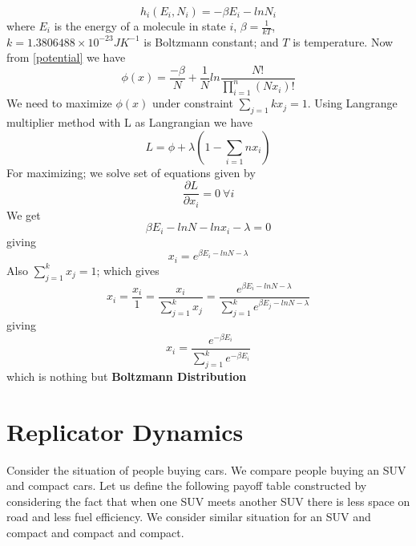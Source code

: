\documentclass[letterpaper,english,10pt]{article}
\begin{document}
\begin{equation}\label{thermogame}
    h_i(E_i,N_i) = -\beta E_i - ln N_i
\end{equation}
where $E_i$ is the energy of a molecule in state $i$, $\beta=\frac{1}{kT}$, $k=1.3806488 \times 10^{-23} JK^{-1}$ is Boltzmann constant; and $T$ is temperature.
 Now from \ref{potential} we have 
 \begin{equation}
 \phi(x) = \frac{-\beta}{N}+ \frac{1}{N}ln\frac{N!}{\prod_{i=1}^{n}(Nx_i)!}
 \end{equation}
 We need to maximize $\phi(x)$ under constraint $\sum_{j=1}{k}x_j = 1$.
 Using Langrange multiplier method with L as Langrangian we have
 \begin{equation}
     L=\phi + \lambda(1-\sum_{i=1}{n}x_i)
 \end{equation}
 For maximizing; we solve set of equations given by
 \begin{equation}
     \frac{\partial L}{\partial x_i} =0 ~ \forall i
 \end{equation}
 We get 
 \begin{equation}
     \beta E_i  - ln N - ln x_i -\lambda = 0 
 \end{equation}
 giving
 \begin{equation}
     x_i = e ^ {\beta E_i  - ln N  -\lambda}
 \end{equation}
 Also $\sum_{j=1}^{k}x_j=1$; which gives
 \begin{equation}
     x_i = \frac{x_i}{1} = \frac{x_i}{\sum_{j=1}^{k}x_j} = \frac{e ^ {\beta E_i  - ln N  -\lambda}}{\sum_{j=1}^{k}e ^ {\beta E_j  - ln N  -\lambda}}
 \end{equation}
 giving
 \begin{equation}
     x_i = \frac{e^{-\beta E_i}}{\sum_{j=1}^{k}e^{-\beta E_i}}
 \end{equation}
 which is nothing but \textbf{Boltzmann Distribution}
 
\section{Replicator Dynamics}
Consider the situation of people buying cars. We compare people buying an SUV and compact cars. Let us define the following payoff table constructed by considering the fact that when one SUV meets another SUV there is less space on road and less fuel efficiency. We consider  similar situation for an SUV and compact and compact and compact.
\end{document}
